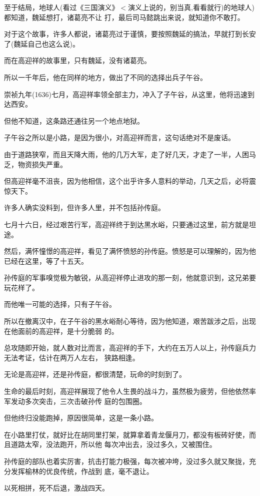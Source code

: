 \documentclass[11pt,a4paper,onecolumn]{article}
\begin{document}
至于结局，地球人(看过《三国演义》$<$演义上说的，别当真,看看就行)的地球人)都知道，魏延想打，诸葛亮不让
打，最后司马懿跳出来说，就知道你不敢打。

对于这个故事，许多人都说，诸葛亮过于谨慎，要按照魏延的搞法，早就打到长安了(魏延自己也这么说)。

而在高迎祥的故事里，只有魏延，没有诸葛亮。

所以一千年后，他在同样的地方，做出了不同的选择\myrule 出兵子午谷。

崇祯九年(1636)七月，高迎祥率领全部主力，冲入了子午谷，从这里，他将迅速到达西安。

但他不知道，这条路还通往另一个地点\myrule 地狱。

子午谷之所以是小路，是因为很小，对高迎祥而言，这句话绝对不是废话。

由于道路狭窄，而且天降大雨，他的几万大军，走了好几天，才走了一半，人困马乏，物资损失严重。

但高迎祥毫不沮丧，因为他相信，这个出乎许多人意料的举动，几天之后，必将震惊天下。

许多人确实没料到，但许多人里，并不包括孙传庭。

七月十六日，经过艰苦行军，高迎祥终于到达黑水峪，只要通过这里，前方就是坦途。

然后，满怀憧憬的高迎祥，看见了满怀愤怒的孙传庭。愤怒是可以理解的，因为他已经在这里，等了十五天。

孙传庭的军事嗅觉极为敏锐，从高迎祥停止进攻的那一刻，他就意识到，这兄弟要玩花样了。

而他唯一可能的选择，只有子午谷。

所以在撤离汉中，在子午谷的黑水峪耐心等待，因为他知道，艰苦跋涉之后，出现在他面前的高迎祥，是十分脆弱
的。

总攻随即开始，就人数对比而言，高迎祥的手下，大约在五万人以上，孙传庭兵力无法考证，估计在两万人左右，
狭路相逢。

无论是高迎祥，还是孙传庭，都很清楚，玩命的时刻到了。

生命的最后时刻，高迎祥展现了他令人生畏的战斗力，虽然极为疲劳，但他依然率军发动多次突击，三次击破孙传
庭的包围圈。

但他终归没能跑掉，原因很简单，这是一条小路。

在小路里打仗，就好比在胡同里打架，就算拿着青龙偃月刀，都没有板砖好使，而且道路太窄，没法跑开，所以他
每次冲出去，没过多久，又被围住。

孙传庭的部队也着实厉害，抗击打能力极强，每次被冲垮，没过多久就又聚拢，充分发挥榆林的优良传统，作战到
底，毫不退让。

以死相拼，死不后退，激战四天。
\end{document}
